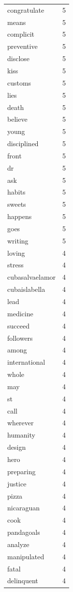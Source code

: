 \begin{tabular}{lr}
congratulate & 5 \\
means & 5 \\
complicit & 5 \\
preventive & 5 \\
disclose & 5 \\
kiss & 5 \\
customs & 5 \\
lies & 5 \\
death & 5 \\
believe & 5 \\
young & 5 \\
disciplined & 5 \\
front & 5 \\
dr & 5 \\
ask & 5 \\
habits & 5 \\
sweets & 5 \\
happens & 5 \\
goes & 5 \\
writing & 5 \\
loving & 4 \\
stress & 4 \\
cubasalvaelamor & 4 \\
cubaislabella & 4 \\
lead & 4 \\
medicine & 4 \\
succeed & 4 \\
followers & 4 \\
among & 4 \\
international & 4 \\
whole & 4 \\
may & 4 \\
st & 4 \\
call & 4 \\
wherever & 4 \\
humanity & 4 \\
design & 4 \\
hero & 4 \\
preparing & 4 \\
justice & 4 \\
pizza & 4 \\
nicaraguan & 4 \\
cook & 4 \\
pandagoals & 4 \\
analyze & 4 \\
manipulated & 4 \\
fatal & 4 \\
delinquent & 4 \\

\end{tabular}
